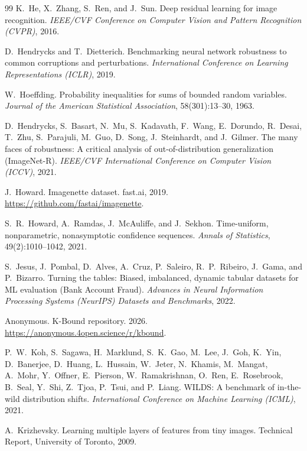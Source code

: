 \begin{thebibliography}{99}
K.~He, X.~Zhang, S.~Ren, and J.~Sun.
Deep residual learning for image recognition.
\textit{IEEE/CVF Conference on Computer Vision and Pattern Recognition (CVPR)}, 2016.

D.~Hendrycks and T.~Dietterich.
Benchmarking neural network robustness to common corruptions and
perturbations.
\textit{International Conference on Learning Representations (ICLR)}, 2019.

W.~Hoeffding.
Probability inequalities for sums of bounded random variables.
\textit{Journal of the American Statistical Association}, 58(301):13--30, 1963.

D.~Hendrycks, S.~Basart, N.~Mu, S.~Kadavath, F.~Wang, E.~Dorundo, R.~Desai,
T.~Zhu, S.~Parajuli, M.~Guo, D.~Song, J.~Steinhardt, and J.~Gilmer.
The many faces of robustness: A critical analysis of out-of-distribution
generalization (ImageNet-R).
\textit{IEEE/CVF International Conference on Computer Vision (ICCV)}, 2021.

J.~Howard.
Imagenette dataset.
fast.ai, 2019.
\url{https://github.com/fastai/imagenette}.

S.~R.~Howard, A.~Ramdas, J.~McAuliffe, and J.~Sekhon.
Time-uniform, nonparametric, nonasymptotic confidence sequences.
\textit{Annals of Statistics}, 49(2):1010--1042, 2021.

S.~Jesus, J.~Pombal, D.~Alves, A.~Cruz, P.~Saleiro, R.~P.~Ribeiro, J.~Gama,
and P.~Bizarro.
Turning the tables: Biased, imbalanced, dynamic tabular datasets for ML
evaluation (Bank Account Fraud).
\textit{Advances in Neural Information Processing Systems (NeurIPS) Datasets
and Benchmarks}, 2022.

Anonymous.
K-Bound repository.
2026.
\url{https://anonymous.4open.science/r/kbound}.

P.~W.~Koh, S.~Sagawa, H.~Marklund, S.~K.~Gao, M.~Lee, J.~Goh, K.~Yin,
D.~Banerjee, D.~Huang, L.~Hussain, W.~Jeter, N.~Khamis, M.~Mangat,
A.~Mohr, Y.~Offner, E.~Pierson, W.~Ramakrishnan, O.~Ren, E.~Rosebrook,
B.~Seal, Y.~Shi, Z.~Tjoa, P.~Tsui, and P.~Liang.
WILDS: A benchmark of in-the-wild distribution shifts.
\textit{International Conference on Machine Learning (ICML)}, 2021.

A.~Krizhevsky.
Learning multiple layers of features from tiny images.
Technical Report, University of Toronto, 2009.


\end{thebibliography}
